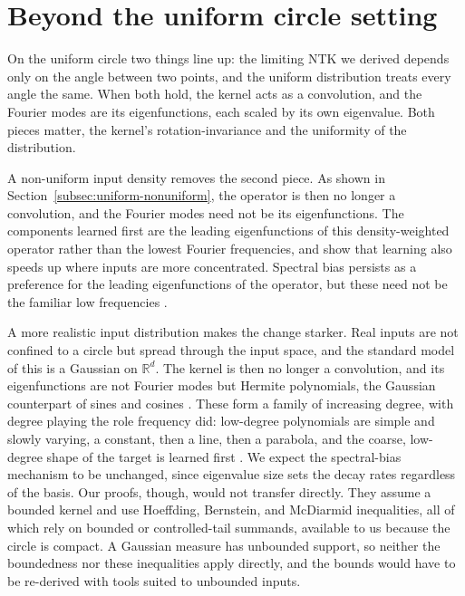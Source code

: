 \section{Beyond the uniform circle setting}
\label{sec:discussion-beyond-uniform-circle}

On the uniform circle two things line up: the limiting NTK we derived depends
only on the angle between two points, and the uniform distribution treats every
angle the same. When both hold, the kernel acts as a convolution, and the Fourier
modes are its eigenfunctions, each scaled by its own eigenvalue. Both pieces
matter, the kernel's rotation-invariance and the uniformity of the distribution.

A non-uniform input density removes the second piece. As shown in
Section~\ref{subsec:uniform-nonuniform}, the operator is then no longer a
convolution, and the Fourier modes need not be its eigenfunctions. The components
learned first are the leading eigenfunctions of this density-weighted operator
rather than the lowest Fourier frequencies, and
\citet{basri2020frequencybiasneuralnetworks} show that learning also speeds up
where inputs are more concentrated. Spectral bias persists as a preference for
the leading eigenfunctions of the operator, but these need not be the familiar
low frequencies \citep{basri2020frequencybiasneuralnetworks,
	bowman2022spectralbiasoutsidetraining}.

A more realistic input distribution makes the change starker. Real inputs are
not confined to a circle but spread through the input space, and the standard
model of this is a Gaussian on \(\mathbb{R}^d\). The kernel is then no longer a
convolution, and its eigenfunctions are not Fourier modes but Hermite
polynomials, the Gaussian counterpart of sines and cosines
\citep{mei2022generalization}. These form a family of increasing degree, with
degree playing the role frequency did: low-degree polynomials are simple and
slowly varying, a constant, then a line, then a parabola, and the coarse,
low-degree shape of the target is learned first
\citep{cao2020understandingspectralbiasdeep}. We expect the spectral-bias
mechanism to be unchanged, since eigenvalue size sets the decay rates
regardless of the basis. Our proofs, though, would not transfer directly. They
assume a bounded kernel and use Hoeffding, Bernstein, and McDiarmid
inequalities, all of which rely on bounded or controlled-tail summands,
available to us because the circle is compact. A Gaussian measure has unbounded
support, so neither the boundedness nor these inequalities apply directly, and
the bounds would have to be re-derived with tools suited to unbounded inputs.

